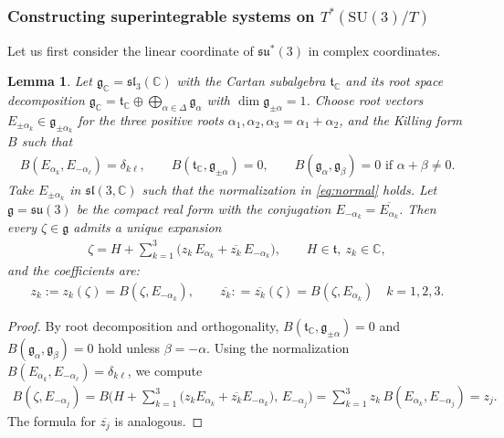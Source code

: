 \documentclass[11pt]{amsart}
\newtheorem{lemma}[theorem]{Lemma}
\theoremstyle{definition}
\theoremstyle{plain}
\theoremstyle{conclusion}
\begin{document}
\subsubsection{Constructing superintegrable systems on $T^*(\mathrm{SU}(3)/T)$}

Let us first consider the linear coordinate of $\mathfrak{su}^*(3)$ in complex coordinates.
 
\begin{lemma} 
\label{lem:root-coord}
Let $\mathfrak{g}_\mathbb{C}=\mathfrak{sl}_3(\mathbb{C})$ with the Cartan subalgebra $\mathfrak{t}_\mathbb{C}$ and its root space decomposition $\mathfrak{g}_\mathbb{C} = \mathfrak{t}_\mathbb{C}  \oplus \bigoplus_{\alpha\in\Delta}\mathfrak{g}_\alpha$ with $  \dim \mathfrak{g}_{\pm\alpha}=1$. Choose root vectors $E_{\pm\alpha_k}\in\mathfrak{g}_{\pm\alpha_k}$ for the three positive roots $\alpha_1,\alpha_2,\alpha_3=\alpha_1+\alpha_2$, and the Killing form $B$ such that
\begin{align}
B(E_{\alpha_k},E_{-\alpha_\ell})=\delta_{k\ell},\qquad B(\mathfrak{t}_\mathbb{C},\mathfrak{g}_{\pm\alpha})=0,\qquad B(\mathfrak{g}_\alpha,\mathfrak{g}_\beta)=0 \text{ if }\alpha+\beta\neq 0. \label{eq:normal} 
\end{align} Take $E_{\pm \alpha_k}$ in $\mathfrak{sl}(3,\mathbb{C})$ such that the normalization in \eqref{eq:normal} holds. Let $\mathfrak{g}=\mathfrak{su}(3)$ be the compact real form with the conjugation $E_{-\alpha_k}=\overline{E_{\alpha_k}}$. Then every $\zeta\in\mathfrak{g}$ admits a unique expansion \begin{align*}
\zeta = H +  \sum_{k=1}^3\Big(z_k\,E_{\alpha_k}+\overline{z_k}\,E_{-\alpha_k}\Big), \qquad H\in\mathfrak{t},\ z_k\in\mathbb{C},
\end{align*} and the coefficients are: \begin{align}
  z_k:=  z_k(\zeta) = B(\zeta,E_{-\alpha_k}),\qquad \overline{z_k} : = \overline{z_k}(\zeta)= B(\zeta,E_{\alpha_k}) \quad  k=1,2,3. \label{eq:complexcoe}
\end{align}
\end{lemma}

\begin{proof}
By root decomposition and orthogonality, $B(\mathfrak{t}_\mathbb{C},\mathfrak{g}_{\pm\alpha})=0$ and $B(\mathfrak{g}_{\alpha},\mathfrak{g}_{\beta})=0$ hold unless $\beta=-\alpha$. Using the normalization $B(E_{\alpha_k},E_{-\alpha_\ell})=\delta_{k\ell}$, we compute \begin{align*}
B(\zeta,E_{-\alpha_j}) = B\Big(H+\sum_{k=1}^3 \big(z_k E_{\alpha_k}+\overline{z_k} E_{-\alpha_k}\big),\,E_{-\alpha_j}\Big) = \sum_{k=1}^3 z_k\,B(E_{\alpha_k},E_{-\alpha_j}) = z_j.
\end{align*} The formula for $\overline{z_j}$ is analogous.
\end{proof}
\end{document}
